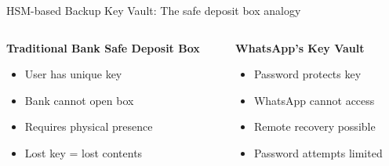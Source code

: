 \documentclass[aspectratio=169, lualatex, handout]{beamer}
\begin{document}
\begin{frame}{HSM-based Backup Key Vault: The safe deposit box analogy}
	\begin{columns}[c]
		\begin{column}{0.5\textwidth}
			\textbf{Traditional Bank Safe Deposit Box}
			\begin{itemize}
				\item User has unique key
				\item Bank cannot open box
				\item Requires physical presence
				\item Lost key = lost contents
			\end{itemize}
		\end{column}
		\begin{column}{0.5\textwidth}
			\textbf{WhatsApp's Key Vault}
			\begin{itemize}
				\item Password protects key
				\item WhatsApp cannot access
				\item Remote recovery possible
				\item Password attempts limited
			\end{itemize}
		\end{column}
	\end{columns}
\end{frame}
\end{document}
